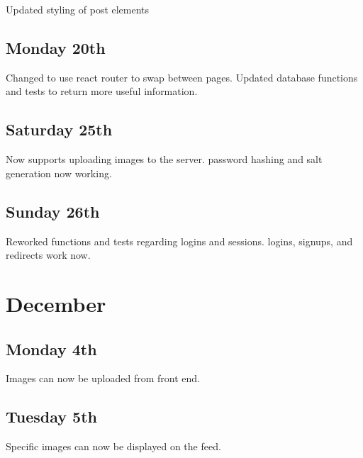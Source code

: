 \documentclass[]{final_report}
\begin{document}
Updated styling of post elements

\subsection{Monday 20th} 

Changed to use react router to swap between pages. Updated database functions and tests to return more useful information.

\subsection{Saturday 25th} 

Now supports uploading images to the server. password hashing and salt generation now working.

\subsection{Sunday 26th} 

Reworked functions and tests regarding logins and sessions. logins, signups, and redirects work now.

\section{December} 

\subsection{Monday 4th} 

Images can now be uploaded from front end.

\subsection{Tuesday 5th} 

Specific images can now be displayed on the feed.
\end{document}
